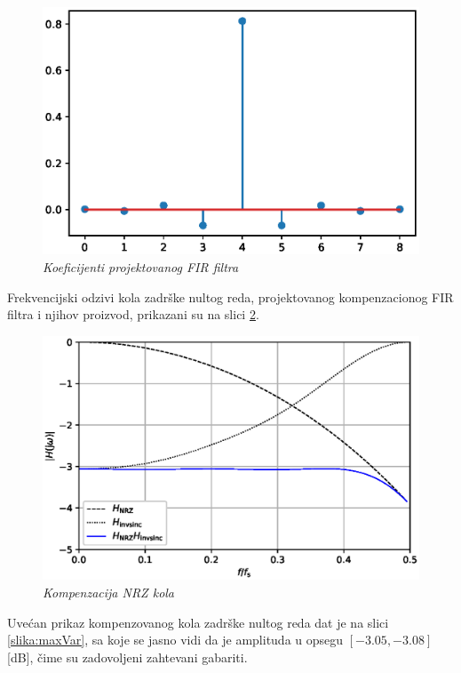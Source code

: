 \documentclass[conference]{IEEEtran}
\begin{document}
\begin{figure}[h]
	\centering
	\includegraphics[scale=0.5]{./slike/FIR.eps}
	\caption{\textsl{Koeficijenti projektovanog FIR filtra}}
	\label{slika:FIR}
\end{figure}

Frekvencijski odzivi kola zadrške nultog reda, projektovanog kompenzacionog FIR filtra i njihov proizvod, prikazani su na slici \ref{slika:nrz_komp}.

\begin{figure}[h]
	\centering
	\includegraphics[scale=0.45]{./slike/nrz_komp.eps}
	\caption{\textsl{Kompenzacija NRZ kola}}
	\label{slika:nrz_komp}
\end{figure}

Uvećan prikaz kompenzovanog kola zadrške nultog reda dat je na slici \ref{slika:maxVar}, sa koje se jasno vidi da je amplituda u opsegu $[-3.05, -3.08]$\,[dB], čime su zadovoljeni zahtevani gabariti.
\end{document}

